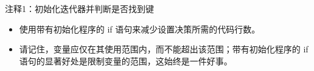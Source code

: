 {\footnotesize
注释1：初始化迭代器并判断是否找到键
}


\begin{itemize}
\item
使用带有初始化程序的 if 语句来减少设置决策所需的代码行数。

\item
请记住，变量应仅在其使用范围内，而不能超出该范围；带有初始化程序的 if 语句的显著好处是限制变量的范围，这始终是一件好事。
\end{itemize}















